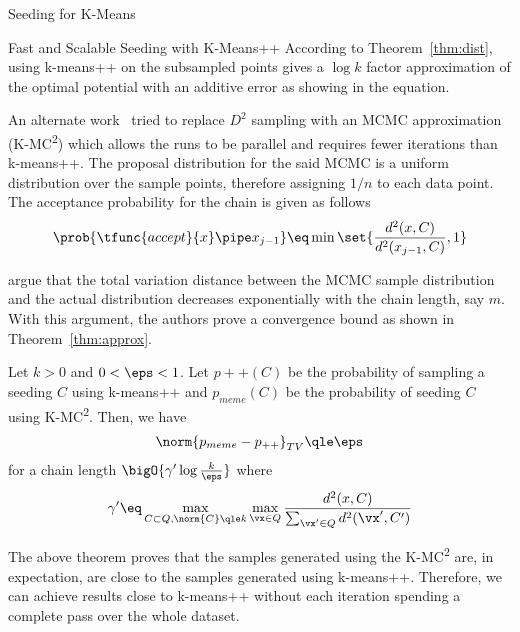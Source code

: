 \documentclass[10pt]{article}
\begin{document}
\begin{psection}{Seeding for K-Means}
\begin{psubsection}{Fast and Scalable Seeding with K-Means++}
        According to Theorem~\ref{thm:dist}, using k-means++ on the subsampled points
        gives a $\log k$ factor approximation of the optimal potential with an additive
        error as showing in the equation.

        An alternate work~\cite{approx-kmeanspp} tried to replace $D^2$ sampling with an
        MCMC approximation (K-MC\textsuperscript{2}) which allows the runs to be
        parallel and requires fewer iterations than k-means++. The proposal distribution
        for the said MCMC is a uniform distribution over the sample points, therefore
        assigning $1/n$ to each data point. The acceptance probability for the chain is
        given as follows
        \begin{align*}
            \prob{\tfunc{accept}{x} \pipe x_{j - 1}}
                \eq \min \set{\frac{d^2(x, C)}{d^2(x_{j - 1}, C)}, 1}
        \end{align*}

        \citet{approx-kmeanspp} argue that the total variation distance between the
        MCMC sample distribution and the actual distribution decreases exponentially
        with the chain length, say $m$. With this argument, the authors prove a
        convergence bound as shown in Theorem~\ref{thm:approx}.

        \begin{theorem}%
            \label{thm:approx}
            Let $k > 0$ and $0 < \eps < 1$. Let $p++(C)$ be the probability of sampling
            a seeding $C$ using k-means++ and $p_{meme}(C)$ be the probability of
            seeding $C$ using K-MC\textsuperscript{2}. Then, we have
            \begin{align*}
                \norm{p_{meme} - p_{++}}_{TV} \qle \eps
            \end{align*}
            for a chain length $\bigO{\gamma' \log \frac{k}{\eps}}$ where
            \begin{align*}
                \gamma' \eq \max_{C \subset Q, \norm{C} \qle k} \max_{\vx \in Q} \frac{d^2(x, C)}{\sum_{\vx' \in Q} d^2(\vx', C')}
            \end{align*}
        \end{theorem}

        The above theorem proves that the samples generated using the
        K-MC\textsuperscript{2} are, in expectation, are close to the samples generated
        using k-means++. Therefore, we can achieve results close to k-means++ without 
        each iteration spending a complete pass over the whole dataset.


\end{psubsection}
\end{psection}
\end{document}
